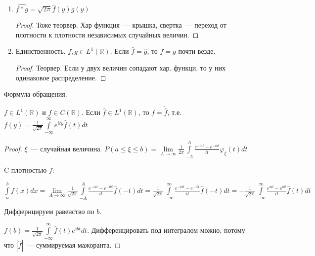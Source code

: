 \begin{properties}
\begin{enumerate}
              $f(ax)^\wedge = \frac{1}{a}\hat f(\frac{y}{a})$

              \begin{proof}
                  Проверяли для хар. функций на теорвере.
              \end{proof}
        \item $\widehat{f \ast g} = \sqrt{2\pi} \hat f(y) \hat g (y)$

              \begin{proof}
                  Тоже теорвер. Хар функция~--- крышка, свертка~--- переход от плотности к плотности независимых случайных величин.
              \end{proof}
        \item Единственность. $f, g \in L^1(\mathbb{R})$. Если $\hat f = \hat g$, то $f = g$ почти везде.

              \begin{proof}
                  Теорвер. Если у двух величин сопадают хар. функци, то у них одинаковое распределение.
              \end{proof}
    \end{enumerate}
\end{properties}

\begin{theorem}
    Формула обращения.

    $f \in L^1(\mathbb{R})$ и $f \in C(\mathbb{R})$. Если $\hat f \in L^1(\mathbb{R})$, то $f = \check{\hat f}$, т.е. $f(y) = \frac{1}{\sqrt{2\pi}}\int\limits_{-\infty}^{\infty} e^{ity} \hat f(t)dt$
\end{theorem}

\begin{proof}
    $\xi$~--- случайная величина. $P(a \leqslant \xi \leqslant b) = \lim\limits_{A \rightarrow \infty} \frac{1}{2\pi}\int\limits_{-A}^{A}\frac{e^{-iat} - e^{-ibt}}{it}\varphi_{\xi}(t)dt$

    C плотностью $f$:

    $\int\limits_{a}^{b}f(x)dx = \lim\limits_{A \rightarrow \infty} \frac{1}{\sqrt{2\pi}}\int\limits_{-A}^{A}\frac{e^{-iat} - e^{-ibt}}{it}\hat f(-t)dt = \frac{1}{\sqrt{2\pi}}\int\limits_{-\infty}^{\infty}\frac{e^{-iat} - e^{-ibt}}{it}\hat f(-t)dt = -\frac{1}{\sqrt{2\pi}}\int\limits_{-\infty}^{\infty}\frac{e^{iat} - e^{ibt}}{it}\hat f(t)dt$

    Диффернцируем равенство по $b$.

    $f(b) = \frac{1}{\sqrt{2\pi}}\int\limits_{-\infty}^{\infty}\hat f(t)e^{ibt}dt$. Дифференцировать под интегралом можно, потому что $|\hat f|$~--- суммируемая мажоранта.
\end{proof}

